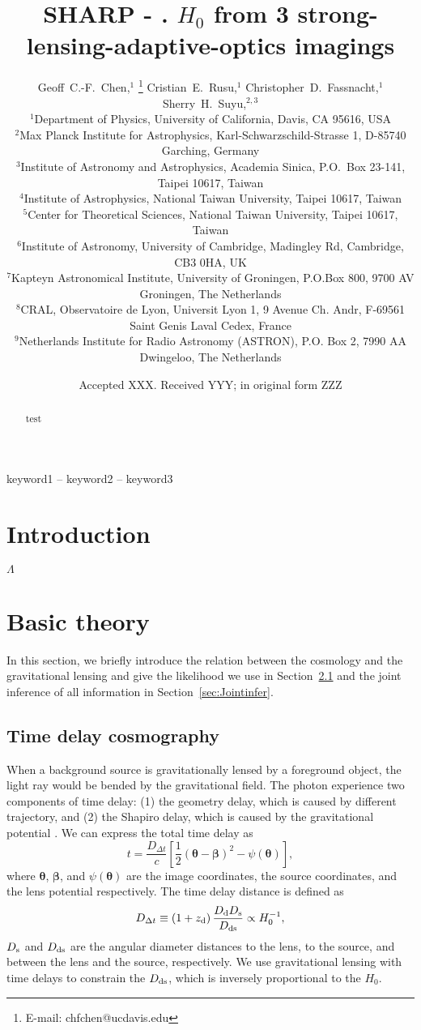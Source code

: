 \documentclass[fleqn,usenatbib]{mnras}
\title[$H_{0} from 3 AO lensing imaging$]{SHARP - \uppercase\expandafter{\romannumeral 5}. $H_{0}$ from 3 strong-lensing-adaptive-optics imagings}
\author[G.C.-F.~Chen et al.]{
Geoff~C.-F.~Chen,$^{1}$ \thanks{E-mail: chfchen@ucdavis.edu}
Cristian~E.~Rusu,$^{1}$
Christopher~D.~Fassnacht,$^{1}$
Sherry~H.~Suyu,$^{2,3}$
\newauthor{
Aleksi Halkola,
Matthew W.~Auger,$^{6}$
L$\acute{\text{e}}$on V.~E.~Koopmans,$^{7}$
David J.~Lagattuta,$^{8}$}
\newauthor{
John P.~McKean$^{7,9}$
and Simona Vegetti$^{2}$
}
\\
$^{1}$Department of Physics, University of California, Davis, CA 95616, USA\\
$^{2}$Max Planck Institute for Astrophysics, Karl-Schwarzschild-Strasse 1, D-85740 Garching, Germany\\
$^{3}$Institute of Astronomy and Astrophysics, Academia Sinica, P.O.~Box 23-141, Taipei 10617, Taiwan\\
$^{4}$Institute of Astrophysics, National Taiwan University, Taipei 10617, Taiwan\\
$^{5}$Center for Theoretical Sciences, National Taiwan University, Taipei 10617, Taiwan\\
$^{6}$Institute of Astronomy, University of Cambridge, Madingley Rd, Cambridge, CB3 0HA, UK\\
$^{7}$Kapteyn Astronomical Institute, University of Groningen, P.O.Box 800, 9700 AV Groningen, The Netherlands\\
$^{8}$CRAL, Observatoire de Lyon, Universit Lyon 1, 9 Avenue Ch. Andr, F-69561 Saint Genis Laval Cedex, France\\
$^{9}$Netherlands Institute for Radio Astronomy (ASTRON), P.O. Box 2, 7990 AA Dwingeloo, The Netherlands \\
}
\date{Accepted XXX. Received YYY; in original form ZZZ}
\newcommand{\sref}[1]{Section~\ref{#1}}
\def\zd{z_{\rm d}}
\def\dt{D_{\Delta t}}
\begin{document}
\label{firstpage}
\pagerange{\pageref{firstpage}--\pageref{lastpage}}
\maketitle

\begin{abstract}
test
\end{abstract}

\begin{keywords}
keyword1 -- keyword2 -- keyword3
\end{keywords}



\section{Introduction}
$\Lambda$
\citep{PerlmutterEtal99,RiessEtal98}




\section{Basic theory}
In this section, we briefly introduce the relation between the cosmology and the gravitational lensing and give the likelihood we use in \sref{sec:TDcosmo} and the joint inference of all information in \sref{sec:Jointinfer}.

\subsection{Time delay cosmography}
\label{sec:TDcosmo} %
 When a background source is gravitationally lensed by  a foreground object, the light ray would be bended by the  gravitational field. The photon experience two components of time delay: (1) the geometry delay,  which is caused by different trajectory, and (2) the Shapiro delay, which is caused by the gravitational potential \citep{Shapiro64, Refsdal64}. We can express the total time delay as 
\begin{equation}
\label{eq:theory6}
t=\frac{\dt}{c}\left[\frac{1}{2}
\left(\boldsymbol{\theta}-\boldsymbol{\beta}\right)^{2}-\psi\left(\boldsymbol{\theta}\right)\right],
\end{equation}
where $\boldsymbol{\theta}$, $\boldsymbol{\beta}$, and
$\psi\left(\boldsymbol{\theta}\right)$ are the image coordinates, the source
coordinates, and the lens potential respectively.
The time delay distance is defined as
\begin{equation}
\label{eq:TDdistance}
\dt\equiv\left(1+
\zd\right)\frac{D_{\rm d}D_{\rm s}}{{D_{\rm ds}}}\propto H_{0}^{-1},
\end{equation}
$D_{\rm s}$ and $D_{\rm ds}$ are the angular diameter distances to the lens, to the source, and between the lens and the source, respectively. We use gravitational lensing with time delays to constrain the $D_{\rm ds}$, which is inversely proportional to the $H_{0}$.
\end{document}
